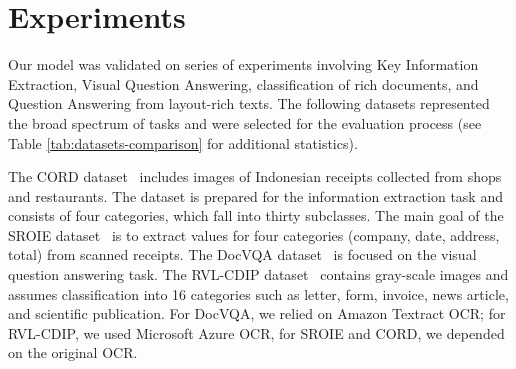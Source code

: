 \documentclass[runningheads]{llncs}
\begin{document}
\section{Experiments}

Our model was validated on series of experiments involving Key Information Extraction, Visual Question Answering, classification of rich documents, and Question Answering from layout-rich texts. The following datasets represented the broad spectrum of tasks and were selected for the evaluation process (see Table \ref{tab:datasets-comparison} for additional statistics).

The CORD dataset~\cite{park2019cord} includes images of Indonesian receipts collected from shops and restaurants. The dataset is prepared for the information extraction task and consists of four categories, which fall into thirty subclasses. The main goal of the SROIE dataset~\cite{Huang2019ICDAR2019CO} is to extract values for four categories (company, date, address, total) from scanned receipts. The DocVQA dataset~\cite{mathew2020docvqa} is focused on the visual question answering task. The RVL-CDIP dataset~\cite{harley2015icdar} contains gray-scale images and assumes classification into 16 categories such as letter, form, invoice, news article, and scientific publication. For DocVQA, we relied on Amazon Textract OCR; for RVL-CDIP, we used Microsoft Azure OCR, for SROIE and CORD, we depended on the original OCR.
\end{document}
